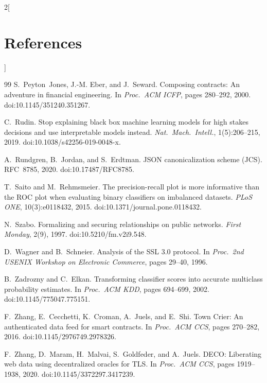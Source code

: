 \documentclass[10pt,a4paper]{article}
\theoremstyle{tight}
\begin{document}
{\begin{multicols}{2}[\section*{\large References}]
\begin{thebibliography}{99}
 S.~Peyton~Jones, J.-M. Eber, and J.~Seward. Composing contracts: An adventure in
financial engineering. In \emph{Proc.\ ACM ICFP}, pages 280--292, 2000. doi:10.1145/351240.351267.

 C.~Rudin. Stop explaining black box machine learning models for high stakes decisions and use
interpretable models instead. \emph{Nat.\ Mach.\ Intell.}, 1(5):206--215, 2019. doi:10.1038/s42256-019-0048-x.

 A.~Rundgren, B.~Jordan, and S.~Erdtman. JSON canonicalization scheme (JCS). RFC~8785, 2020.
doi:10.17487/RFC8785.

 T.~Saito and M.~Rehmsmeier. The precision-recall plot is more informative than the ROC plot
when evaluating binary classifiers on imbalanced datasets. \emph{PLoS ONE}, 10(3):e0118432, 2015.
doi:10.1371/journal.pone.0118432.

 N.~Szabo. Formalizing and securing relationships on public networks. \emph{First Monday},
2(9), 1997. doi:10.5210/fm.v2i9.548.

 D.~Wagner and B.~Schneier. Analysis of the SSL 3.0 protocol. In \emph{Proc.\ 2nd USENIX
Workshop on Electronic Commerce}, pages 29--40, 1996.

 B.~Zadrozny and C.~Elkan. Transforming classifier scores into accurate multiclass
probability estimates. In \emph{Proc.\ ACM KDD}, pages 694--699, 2002. doi:10.1145/775047.775151.

 F.~Zhang, E.~Cecchetti, K.~Croman, A.~Juels, and E.~Shi. Town Crier: An authenticated data
feed for smart contracts. In \emph{Proc.\ ACM CCS}, pages 270--282, 2016. doi:10.1145/2976749.2978326.

 F.~Zhang, D.~Maram, H.~Malvai, S.~Goldfeder, and A.~Juels. DECO: Liberating web data using
decentralized oracles for TLS. In \emph{Proc.\ ACM CCS}, pages 1919--1938, 2020. doi:10.1145/3372297.3417239.

\end{thebibliography}
\end{multicols}
}
\end{document}
